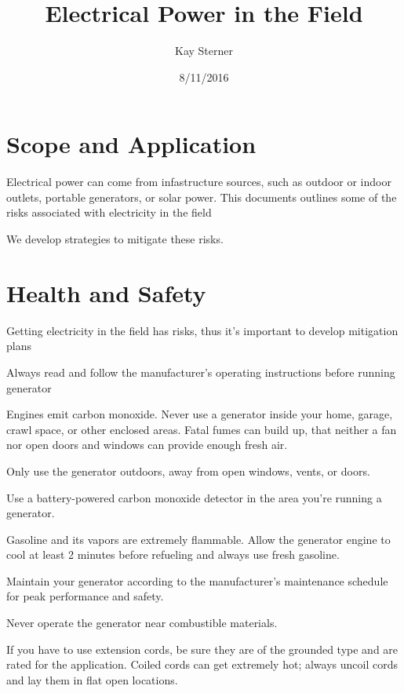 \documentclass[12pt]{../SOP3_beta}
\title{Electrical Power in the Field}
\date{8/11/2016}
\author{Kay Sterner}
\begin{document}


\maketitle

\section{Scope and Application}

\NP Electrical power can come from infastructure sources, such as outdoor or indoor outlets, portable generators, or solar power.
\NP This documents outlines some of the risks associated with electricity in the field

\NP We develop strategies to mitigate these risks.

\section{Health and Safety}

\NP Getting electricity in the field has risks, thus it's important to develop mitigation plans

\NP Always read and follow the manufacturer's operating instructions before running
generator

\NP Engines emit carbon monoxide. Never use a generator inside your home, garage, crawl space, or other enclosed areas. Fatal fumes can build up, that neither a fan nor open doors and windows can provide enough fresh air.

\NP Only use the generator outdoors, away from open windows, vents, or doors.

\NP Use a battery-powered carbon monoxide detector in the area you're running a generator.

\NP Gasoline and its vapors are extremely flammable. Allow the generator engine to cool at least 2 minutes before refueling and always use fresh gasoline. 

\NP Maintain your generator according to the manufacturer’s maintenance schedule for peak performance and safety.

\NP Never operate the generator near combustible materials.

\NP If you have to use extension cords, be sure they are of the grounded type and are rated for the application. Coiled cords can get extremely hot; always uncoil cords and lay them in flat open locations.
\end{document}

